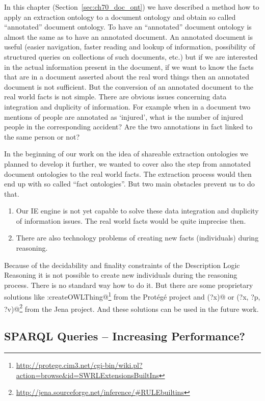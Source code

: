 In this chapter (Section~\ref{sec:ch70_doc_ont}) we have described a method how to apply an extraction ontology to a document ontology and obtain so called ``annotated'' document ontology. To have an ``annotated'' document ontology is almost the same as to have an annotated document. An annotated document is useful (easier navigation, faster reading and lookup of information, possibility of structured queries on collections of such documents, etc.) but if we are interested in the actual information present in the document, if we want to know the facts that are in a document asserted about the real word things then an annotated document is not sufficient. But the conversion of an annotated document to the real world facts is not simple.
There are obvious issues concerning data integration and duplicity of information. For example when in a document two mentions of people are annotated as `injured', what is the number of injured people in the corresponding accident? Are the two annotations in fact linked to the same person or not?

In the beginning of our work on the idea of shareable extraction ontologies we planned to develop it further, we wanted to cover also the step from annotated document ontologies to the real world facts. The extraction process would then end up with so called ``fact ontologies''. But two main obstacles prevent us to do that.

\begin{enumerate}
	\item Our IE engine is not yet capable to solve these data integration and duplicity of information issues. The real world facts would be quite imprecise then.
	\item There are also technology problems of creating new facts (individuals) during reasoning.
\end{enumerate}

Because of the decidability and finality constraints of the Description Logic Reasoning it is not possible to create new individuals during the reasoning process. There is no standard way how to do it. But there are some proprietary solutions like \verb@swrlx:createOWLThing@\footnote{\url{http://protege.cim3.net/cgi-bin/wiki.pl?action=browse&id=SWRLExtensionsBuiltIns}} from the Prot\'{e}g\'{e} project and \verb@makeTemp(?x)@ or \verb@makeInstance(?x, ?p, ?v)@\footnote{\url{http://jena.sourceforge.net/inference/#RULEbuiltins}} from the Jena project.
And these solutions can be used in the future work. 

\subsection{SPARQL Queries -- Increasing Performance?}

